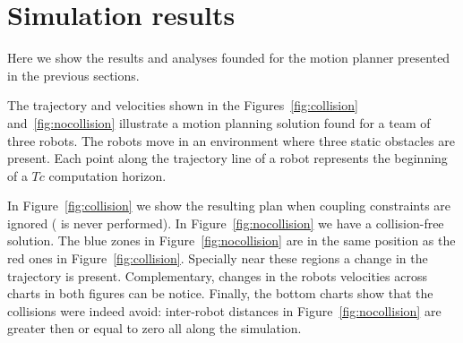 \documentclass[eprint]{actapoly}
\begin{document}



\newpage
\mbox{}\newpage




\section{Simulation results}

Here we show the results and analyses founded for the motion planner presented
in the previous sections.

The trajectory and velocities shown in the Figures~\ref{fig:collision} and~\ref{fig:nocollision}
illustrate a motion planning solution found for a team of three robots.
The robots move in an environment where three static obstacles are present.
Each point along the trajectory line of a robot represents the beginning
of a $Tc$ computation horizon.

In Figure~\ref{fig:collision} we show the resulting plan when coupling constraints
are ignored ( is never performed). In Figure~\ref{fig:nocollision}
we have a collision-free solution. The blue zones in Figure~\ref{fig:nocollision} are in the same position as the red ones in Figure~\ref{fig:collision}. Specially near these regions a change in the trajectory is present. Complementary, changes in the robots velocities across charts in both figures can be notice. Finally, the bottom charts show that the collisions were indeed avoid: inter-robot distances in Figure~\ref{fig:nocollision} are greater then or equal to zero all along the simulation.

\end{document}
